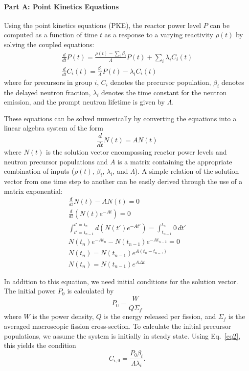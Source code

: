 \documentclass[12pt]{report}
\begin{document}
	
	
	\maketitle
	
	\paragraph{Part A: Point Kinetics Equations}
	Using the point kinetics equations (PKE), the reactor power level $P$ can be computed as a function of time $t$ as a response to a varying reactivity $\rho(t)$ by solving the coupled equations:
	\begin{eqnarray}
	\frac{d}{dt} P(t) = \frac{\rho(t) - \sum_{i} \beta_i}{\Lambda} P(t) + \sum_{i} \lambda_i C_i(t) \label{eq1}\\
	\frac{d}{dt} C_i(t) = \frac{\beta_i}{\Lambda} P(t) - \lambda_i C_i(t) \label{eq2}
	\end{eqnarray}
	where for precursors in group $i$, $C_i$ denotes the precursor population, $\beta_i$ denotes the delayed neutron fraction, $\lambda_i$ denotes the time constant for the neutron emission, and the prompt neutron lifetime is given by $\Lambda$.
	
	These equations can be solved numerically by converting the equations into a linear algebra system of the form
	\begin{equation}
	\frac{d}{dt} N(t) = A N(t)
	\end{equation}
	where $N(t)$ is the solution vector encompassing reactor power levels and neutron precursor populations and $A$ is a matrix containing the appropriate combination of inputs ($\rho(t)$, $\beta_i$, $\lambda_i$, and $\Lambda$). A simple relation of the solution vector from one time step to another can be easily derived through the use of a matrix exponential:
	\begin{eqnarray}
		\frac{d}{dt} N(t) - A N(t) = 0 \\
		\frac{d}{dt} \left( N(t) e^{-At} \right) = 0 \\
		\int_{t' = t_{n-1}}^{t' = t_n} d\left(N(t') e^{-At'} \right) = \int_{t_{n-1}}^{t_n} 0 \, dt' \\
		N(t_n) e^{-At_n} - N(t_{n-1}) e^{-At_{n-1}} = 0 \\
		N(t_n) = N(t_{n-1}) e^{A(t_n - t_{n-1})} \\
		\boxed{N(t_n) = N(t_{n-1}) e^{A \Delta t}}
	\end{eqnarray}
	
	In addition to this equation, we need initial conditions for the solution vector. The initial power $P_0$ is calculated by
	\begin{equation}
	P_0 = \frac{W}{Q \Sigma_f}
	\end{equation}
	where $W$ is the power density, $Q$ is the energy released per fission, and $\Sigma_f$ is the averaged macroscopic fission cross-section. To calculate the initial precursor populations, we assume the system is initially in steady state. Using Eq.~\ref{eq2}, this yields the condition
	\begin{equation}
	C_{i,0} = \frac{P_0 \beta_i}{\Lambda \lambda_i}.
	\label{init_precursor}
	\end{equation}
	
\end{document}

